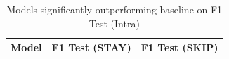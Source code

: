 \begin{table}[H]
\centering
\begin{tabular}{lcc}
\hline
Model & F1 Test (STAY) & F1 Test (SKIP) \\
\hline
\hline
\end{tabular}
\caption{Models significantly outperforming baseline on F1 Test (Intra)}
\label{tab:sig_f1_intra_ablation}
\end{table}

\vspace{1em}